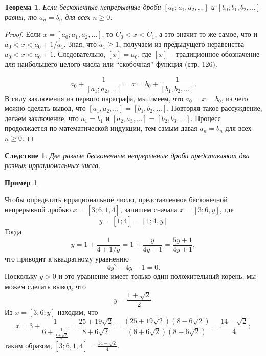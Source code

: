 \documentclass[a4paper,12pt]{article}
\newtheorem{theorem}{Теорема}
\newtheorem{corollary}{Следствие}[theorem]
\theoremstyle{definition}
\newtheorem*{remark}{Пример}
\renewcommand{\headrulewidth}{0pt}
\begin{document}
	\begin{theorem} Если бесконечные непрерывные дроби $[a_0; a_1, a_2, ...]$ и $[b_0; b_1, b_2, ...]$ равны, то $a_n=b_n$ для всех $n\geq0$. \end{theorem}
	\begin{proof} Если $x=[a_0; a_1, a_2, ...]$, то $C_0<x<C_1$, а это значит то же самое, что и $a_0<x<a_0+1/a_1$. Зная, что $a_1\geq1$, получаем из предыдущего неравенства $a_0<x<a_0+1$. Следовательно, $[x]=a_0$, где $[x]$ -- традиционное обозначение для наибольшего целого числа или ``скобочная'' функция (стр. 126).
		
	\[a_0+\frac{1}{[a_1; a_2, ...]}=x=b_0+\frac{1}{[b_1, b_2, ...]}.\]
	В силу заключения из первого параграфа, мы имеем, что $a_0=x=b_0$, из чего можно сделать вывод, что $[a_1, a_2, ...]=[b_1, b_2, ...].$ Повторяя такое рассуждение, делаем заключение, что $a_1=b_1$ и $[a_2, a_3, ...]=[b_2, b_3, ...]$. Процесс	продолжается по математической индукции, тем самым давая $a_n=b_n$ для всех $n\geq0$.\end{proof}
	\begin{corollary}Две разные бесконечные непрерывные дроби представляют два разных иррациональных числа.\end{corollary}
	\begin{remark}\end{remark}
	Чтобы определить иррациональное число, представленное бесконечной непрерывной дробью $x=[3; 6, \overline{1, 4}]$, запишем сначала $x=[3; 6, y]$, где
	\[y=[\overline{1; 4}]=[1; 4, y]\]
	Тогда \[y=1+\frac{1}{4+1/y}=1+\frac{y}{4y+1}=\frac{5y+1}{4y+1},\]
	что приводит к квадратному уравнению
	\[4y^2-4y-1=0.\]
	Поскольку $y>0$ и это уравнение имеет только один положительный корень, мы можем сделать вывод, что
	\[y=\frac{1+\sqrt{2}}{2}.\]
	\newpage
	\renewcommand{\headrulewidth}{0pt}
	\lhead{\textbf{\thepage}}
	\setcounter{page}{318}
	Из $x=[3; 6, y]$ находим, что
	\[x=3+\frac{1}{6+\frac{1}{\frac{1+\sqrt{2}}{2}}}=\frac{25+19\sqrt{2}}{8+6\sqrt{2}}=\frac{(25+19\sqrt{2})(8-6\sqrt{2})}{(8+6\sqrt{2})(8-6\sqrt{2})}=\frac{14-\sqrt{2}}{4};\]
	таким образом, $[3; 6, \overline{1, 4}]=\frac{14-\sqrt{2}}{4}.$
	
\end{document}
